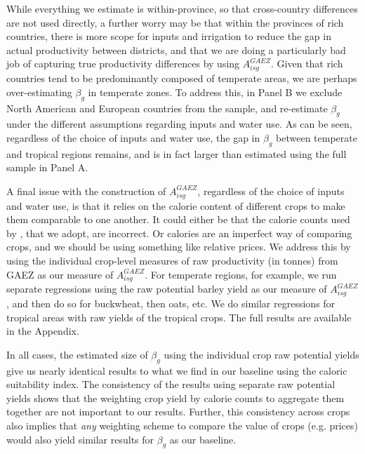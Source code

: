 \documentclass[11pt]{article}
\begin{document}
While everything we estimate is within-province, so that cross-country differences are not used directly, a further worry may be that within the provinces of rich countries, there is more scope for inputs and irrigation to reduce the gap in actual productivity between districts, and that we are doing a particularly bad job of capturing true productivity differences by using $A_{isg}^{GAEZ}$. Given that rich countries tend to be predominantly composed of temperate areas, we are perhaps over-estimating $\beta_g$ in temperate zones. To address this, in Panel B we exclude North American and European countries from the sample, and re-estimate $\beta_g$ under the different assumptions regarding inputs and water use. As can be seen, regardless of the choice of inputs and water use, the gap in $\beta_g$ between temperate and tropical regions remains, and is in fact larger than estimated using the full sample in Panel A. 

A final issue with the construction of $A^{GAEZ}_{isg}$, regardless of the choice of inputs and water use, is that it relies on the calorie content of different crops to make them comparable to one another. It could either be that the calorie counts used by \cite{galorozak2016}, that we adopt, are incorrect. Or calories are an imperfect way of comparing crops, and we should be using something like relative prices. We address this by using the individual crop-level measures of raw productivity (in tonnes) from GAEZ as our measure of $A^{GAEZ}_{isg}$. For temperate regions, for example, we run separate regressions using the raw potential barley yield as our measure of $A^{GAEZ}_{isg}$, and then do so for buckwheat, then oats, etc. We do similar regressions for tropical areas with raw yields of the tropical crops. The full results are available in the Appendix. 

In all cases, the estimated size of $\beta_g$ using the individual crop raw potential yields give us nearly identical results to what we find in our baseline using the caloric suitability index. The consistency of the results using separate raw potential yields shows that the weighting crop yield by calorie counts to aggregate them together are not important to our results. Further, this consistency across crops also implies that \textit{any} weighting scheme to compare the value of crops (e.g. prices) would also yield similar results for $\beta_g$ as our baseline. 
\end{document}
